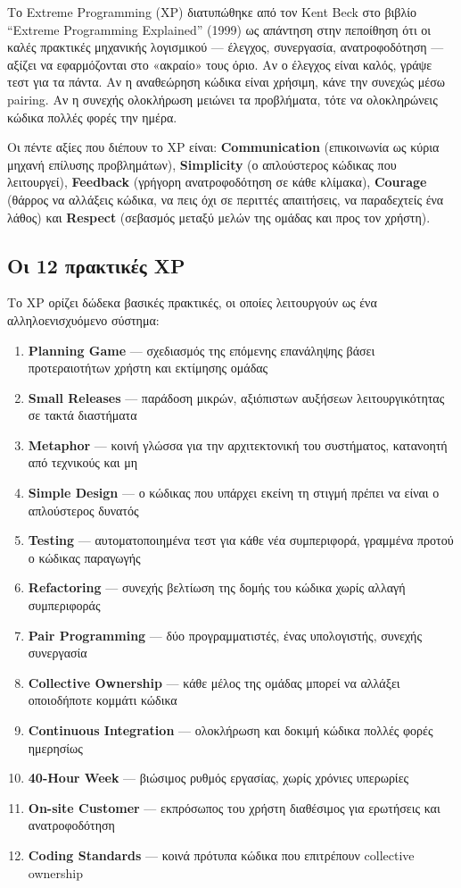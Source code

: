 Το Extreme Programming (XP) διατυπώθηκε από τον Kent Beck στο βιβλίο
``Extreme Programming Explained'' (1999) ως απάντηση στην πεποίθηση ότι
οι καλές πρακτικές μηχανικής λογισμικού --- έλεγχος, συνεργασία,
ανατροφοδότηση --- αξίζει να εφαρμόζονται στο «ακραίο» τους όριο. Αν ο
έλεγχος είναι καλός, γράψε τεστ για τα πάντα. Αν η αναθεώρηση κώδικα
είναι χρήσιμη, κάνε την συνεχώς μέσω pairing. Αν η συνεχής ολοκλήρωση
μειώνει τα προβλήματα, τότε να ολοκληρώνεις κώδικα πολλές φορές την
ημέρα.

Οι πέντε αξίες που διέπουν το XP είναι: \textbf{Communication}
(επικοινωνία ως κύρια μηχανή επίλυσης προβλημάτων), \textbf{Simplicity}
(ο απλούστερος κώδικας που λειτουργεί), \textbf{Feedback} (γρήγορη
ανατροφοδότηση σε κάθε κλίμακα), \textbf{Courage} (θάρρος να αλλάξεις
κώδικα, να πεις όχι σε περιττές απαιτήσεις, να παραδεχτείς ένα λάθος)
και \textbf{Respect} (σεβασμός μεταξύ μελών της ομάδας και προς τον
χρήστη).

\subsection{Οι 12 πρακτικές
XP}\label{ux3bfux3b9-12-ux3c0ux3c1ux3b1ux3baux3c4ux3b9ux3baux3adux3c2-xp}

Το XP ορίζει δώδεκα βασικές πρακτικές, οι οποίες λειτουργούν ως ένα
αλληλοενισχυόμενο σύστημα:

\begin{enumerate}
\def\labelenumi{\arabic{enumi}.}
\tightlist
\item
  \textbf{Planning Game} --- σχεδιασμός της επόμενης επανάληψης βάσει
  προτεραιοτήτων χρήστη και εκτίμησης ομάδας
\item
  \textbf{Small Releases} --- παράδοση μικρών, αξιόπιστων αυξήσεων
  λειτουργικότητας σε τακτά διαστήματα
\item
  \textbf{Metaphor} --- κοινή γλώσσα για την αρχιτεκτονική του
  συστήματος, κατανοητή από τεχνικούς και μη
\item
  \textbf{Simple Design} --- ο κώδικας που υπάρχει εκείνη τη στιγμή
  πρέπει να είναι ο απλούστερος δυνατός
\item
  \textbf{Testing} --- αυτοματοποιημένα τεστ για κάθε νέα συμπεριφορά,
  γραμμένα προτού ο κώδικας παραγωγής
\item
  \textbf{Refactoring} --- συνεχής βελτίωση της δομής του κώδικα χωρίς
  αλλαγή συμπεριφοράς
\item
  \textbf{Pair Programming} --- δύο προγραμματιστές, ένας υπολογιστής,
  συνεχής συνεργασία
\item
  \textbf{Collective Ownership} --- κάθε μέλος της ομάδας μπορεί να
  αλλάξει οποιοδήποτε κομμάτι κώδικα
\item
  \textbf{Continuous Integration} --- ολοκλήρωση και δοκιμή κώδικα
  πολλές φορές ημερησίως
\item
  \textbf{40-Hour Week} --- βιώσιμος ρυθμός εργασίας, χωρίς χρόνιες
  υπερωρίες
\item
  \textbf{On-site Customer} --- εκπρόσωπος του χρήστη διαθέσιμος για
  ερωτήσεις και ανατροφοδότηση
\item
  \textbf{Coding Standards} --- κοινά πρότυπα κώδικα που επιτρέπουν
  collective ownership
\end{enumerate}

